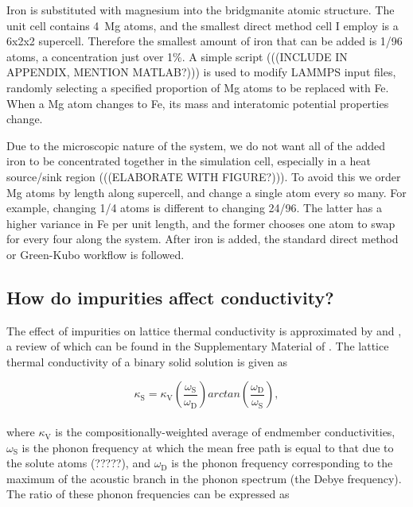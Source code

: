 Iron is substituted with magnesium into the bridgmanite atomic structure. The unit cell contains 4~Mg atoms, and the smallest direct method cell I employ is a 6x2x2 supercell. Therefore the smallest amount of iron that can be added is 1/96 atoms, a concentration just over 1\%. A simple script (((INCLUDE IN APPENDIX, MENTION MATLAB?))) is used to modify LAMMPS input files, randomly selecting a specified proportion of Mg atoms to be replaced with Fe. When a Mg atom changes to Fe, its mass and interatomic potential properties change. 

Due to the microscopic nature of the system, we do not want all of the added iron to be concentrated together in the simulation cell, especially in a heat source/sink region (((ELABORATE WITH FIGURE?))). To avoid this we order Mg atoms by length along supercell, and change a single atom every so many. For example, changing 1/4 atoms is different to changing 24/96. The latter has a higher variance in Fe per unit length, and the former chooses one atom to swap for every four along the system. After iron is added, the standard direct method or Green-Kubo workflow is followed.






\subsection{How do impurities affect conductivity?} 

The effect of impurities on lattice thermal conductivity is approximated by \citet{Klemens1960} and \citet{Padture1997}, a review of which can be found in the Supplementary Material of \citet{Stackhouse2015}. The lattice thermal conductivity of a binary solid solution is given \citep[in][Eq. S6]{Stackhouse2015} as

\begin{equation}
\kappa_{\mathrm{S}}=\kappa_{\mathrm{V}}\left ( \frac{\omega_{\mathrm{S}}}{\omega_{\mathrm{D}}} \right )arctan\left ( \frac{\omega_{\mathrm{D}}}{\omega_{\mathrm{S}}} \right ),
\end{equation}
\\
where $\kappa_{\mathrm{V}}$ is the compositionally-weighted average of endmember conductivities, $\omega_{\mathrm{S}}$ is the phonon frequency at which the mean free path is equal to that due to the solute atoms (?????), and $\omega_{\mathrm{D}}$ is the phonon frequency corresponding to the maximum of the acoustic branch in the phonon spectrum (the Debye frequency). The ratio of these phonon frequencies can be expressed \citep[][Eq. S11]{Stackhouse2015} as

